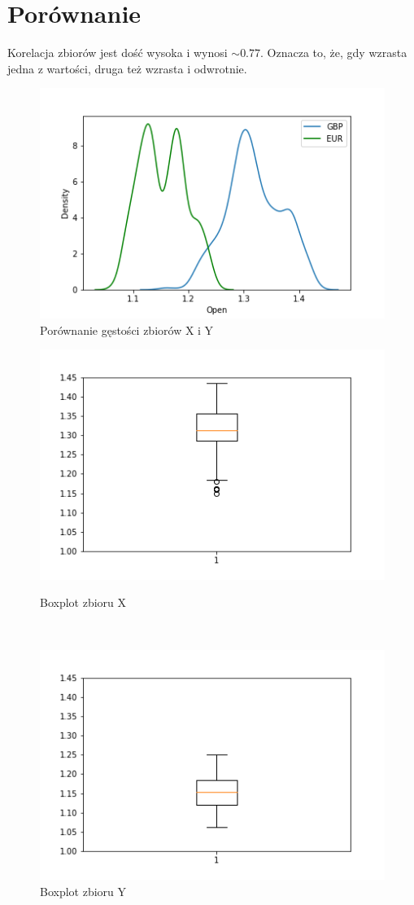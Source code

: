 \documentclass[12pt]{mwart}
\begin{document}
	\section{Porównanie}
	\noindent Korelacja zbiorów jest dość wysoka i wynosi $\sim 0.77$. Oznacza to, że, gdy wzrasta jedna z wartości, druga też wzrasta i odwrotnie.
	\begin{figure}[H]
			\centering
			\includegraphics[scale=0.7]{XY_kde.PNG}
			\caption{Porównanie gęstości zbiorów X i Y}
	\end{figure}
	\begin{figure}[H]
		\begin{minipage}{.5\linewidth}
			\centering
			\includegraphics[scale=0.7]{X_box.PNG}
			\caption{Boxplot zbioru X}
		\end{minipage}
		$\quad$
		\begin{minipage}{.5\linewidth}
			\centering
			\includegraphics[scale=0.7]{Y_box.PNG}
			\caption{Boxplot zbioru Y}
		\end{minipage}
	\end{figure}
\end{document}
